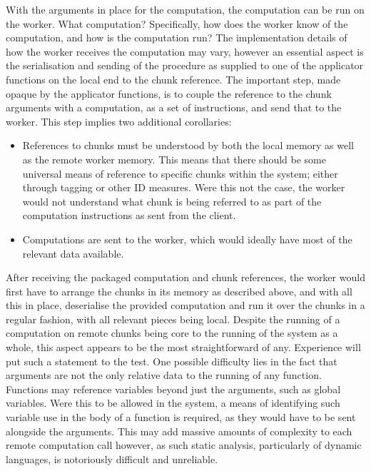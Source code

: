 With the arguments in place for the computation, the computation can be run on the worker.
What computation?
Specifically, how does the worker know of the computation, and how is the computation run?
The implementation details of how the worker receives the computation may vary, however an essential aspect is the serialisation and sending of the procedure as supplied to one of the applicator functions on the local end to the chunk reference.
The important step, made opaque by the applicator functions, is to couple the reference to the chunk arguments with a computation, as a set of instructions, and send that to the worker.
This step implies two additional corollaries:

\begin{itemize} \item References to chunks must be understood by both the local memory as well as the remote worker memory.
	      This means that there should be some universal means of reference to specific chunks within the system; either through tagging or other ID measures.
	      Were this not the case, the worker would not understand what chunk is being referred to as part of the computation instructions as sent from the client.
	\item
	      Computations are sent to the worker, which would ideally have most of
	      the relevant data available.
\end{itemize}

After receiving the packaged computation and chunk references, the worker would first have to arrange the chunks in its memory as described above, and with all this in place, deserialise the provided computation and run it over the chunks in a regular fashion, with all relevant pieces being local.
Despite the running of a computation on remote chunks being core to the running of the system as a whole, this aspect appears to be the most straightforward of any.
Experience will put such a statement to the test.
One possible difficulty lies in the fact that arguments are not the only relative data to the running of any function.
Functions may reference variables beyond just the arguments, such as global variables.
Were this to be allowed in the system, a means of identifying such variable use in the body of a function is required, as they would have to be sent alongside the arguments.
This may add massive amounts of complexity to each remote computation call however, as such static analysis, particularly of dynamic languages, is notoriously difficult and unreliable.

